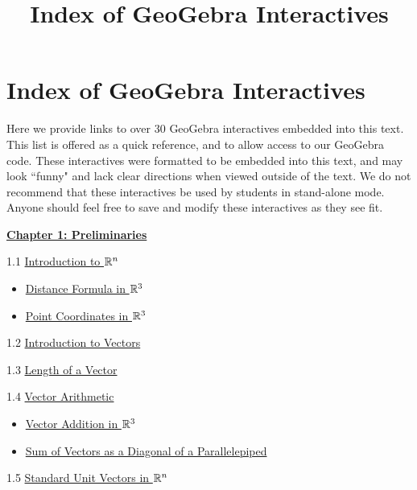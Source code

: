 \documentclass{ximera}
\title{Index of GeoGebra Interactives} \license{CC BY-NC-SA 4.0}
\begin{document}
\begin{abstract}
\end{abstract}
\maketitle
	
\section*{Index of GeoGebra Interactives}
Here we provide links to over 30 GeoGebra interactives embedded into this text.  This list is offered as a quick reference, and to allow access to our GeoGebra code. These interactives were formatted to be embedded into this text, and may look ``funny" and lack clear directions when viewed outside of the text. We do not recommend that these interactives be used by students in stand-alone mode.  Anyone should feel free to save and modify these interactives as they see fit.


\href{https://ximera.osu.edu/oerlinalg/LinearAlgebra/XLAChapter_prelim/main}{\textbf{Chapter 1: Preliminaries}}
	
1.1	\href{https://ximera.osu.edu/oerlinalg/LinearAlgebra/RRN-0010/main}{Introduction to $\mathbb{R}^n$}
\begin{itemize}
\item
\href{https://www.geogebra.org/m/dc267r6v}{Distance Formula in $\mathbb{R}^3$}
\item
\href{https://www.geogebra.org/m/bynu3r84}{Point Coordinates in $\mathbb{R}^3$}
\end{itemize}
	
1.2	\href{https://ximera.osu.edu/oerlinalg/LinearAlgebra/VEC-0010/main}{Introduction to Vectors}
	
1.3	\href{https://ximera.osu.edu/oerlinalg/LinearAlgebra/VEC-0020/main}{Length of a Vector}
	
1.4	\href{https://ximera.osu.edu/oerlinalg/LinearAlgebra/VEC-0030/main}{Vector Arithmetic}

\begin{itemize}
    \item 
    \href{https://www.geogebra.org/m/ccpev33m}{Vector Addition in $\mathbb{R}^3$}
    \item
    \href{https://www.geogebra.org/m/bpzfb7vr}{Sum of Vectors as a Diagonal of a Parallelepiped}
\end{itemize}
	
1.5	\href{https://ximera.osu.edu/oerlinalg/LinearAlgebra/VEC-0035/main}{Standard Unit Vectors in $\mathbb{R}^n$}
\end{document}
